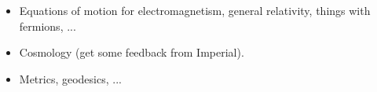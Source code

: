 

\begin{itemize}

\item Equations of motion for electromagnetism, general relativity,
  things with fermions, ...

\item Cosmology (get some feedback from Imperial).

\item Metrics, geodesics, ...

\end{itemize}
